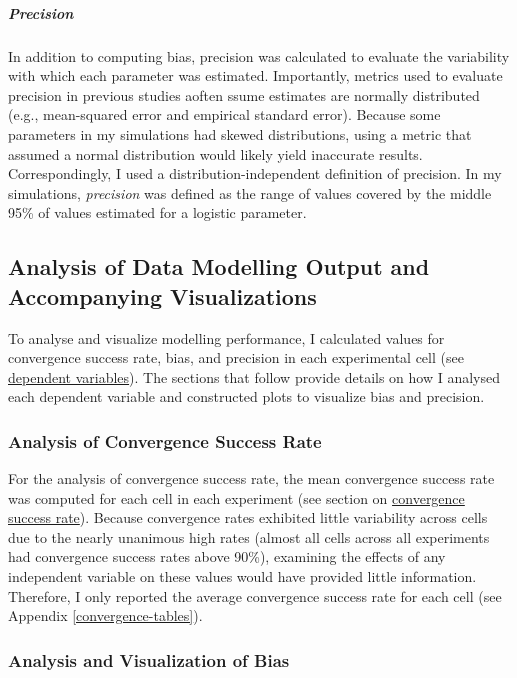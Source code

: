 \documentclass[
12pt, %
twoside,
english]{guelphthesis}
\begin{document}
\hypertarget{pres-precision}{%
\subparagraph{Precision}\label{pres-precision}}

In addition to computing bias, precision was calculated to evaluate the variability with which each parameter was estimated. Importantly, metrics used to evaluate precision in previous studies aoften ssume estimates are normally distributed (e.g., mean-squared error and empirical standard error). Because some parameters in my simulations had skewed distributions, using a metric that assumed a normal distribution would likely yield inaccurate results. Correspondingly, I used a distribution-independent definition of precision. In my simulations, \emph{precision} was defined as the range of values covered by the middle 95\% of values estimated for a logistic parameter.

\hypertarget{analysis-visualization}{%
\subsection{Analysis of Data Modelling Output and Accompanying Visualizations}\label{analysis-visualization}}

To analyse and visualize modelling performance, I calculated values for convergence success rate, bias, and precision in each experimental cell (see \protect\hyperlink{dependent-variables}{dependent variables}). The sections that follow provide details on how I analysed each dependent variable and constructed plots to visualize bias and precision.

\hypertarget{convergence-analysis}{%
\subsubsection{Analysis of Convergence Success Rate}\label{convergence-analysis}}

For the analysis of convergence success rate, the mean convergence success rate was computed for each cell in each experiment (see section on \protect\hyperlink{convergence}{convergence success rate}). Because convergence rates exhibited little variability across cells due to the nearly unanimous high rates (almost all cells across all experiments had convergence success rates above 90\%), examining the effects of any independent variable on these values would have provided little information. Therefore, I only reported the average convergence success rate for each cell (see Appendix \ref{convergence-tables}).

\hypertarget{bias-analysis}{%
\subsubsection{Analysis and Visualization of Bias}\label{bias-analysis}}
\end{document}
